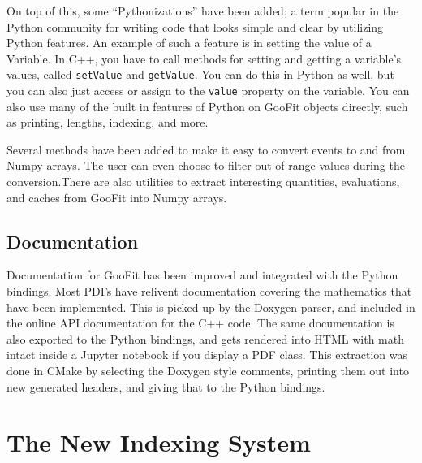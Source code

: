 \documentclass{webofc}
\begin{document}
On top of this, some ``Pythonizations'' have been added; a term popular in the Python community for writing code that looks simple and clear by utilizing Python features. An example of such a feature is in setting the value of a Variable. In C++, you have to call  methods for setting and getting a variable's values, called \texttt{setValue} and \texttt{getValue}. You can do this in Python as well, but you can also just access or assign to the \texttt{value} property on the variable. You can also use many of the built in features of Python on GooFit objects directly, such as printing, lengths, indexing, and more.

Several methods have been added to make it easy to convert events to and from Numpy arrays. The user can even choose to filter out-of-range values during the conversion.There are also utilities to extract interesting quantities, evaluations, and caches from GooFit into Numpy arrays. 

\subsection{Documentation}

Documentation for GooFit has been improved and integrated with the Python bindings. Most PDFs have relivent documentation covering the mathematics that have been implemented. This is picked up by the Doxygen parser, and included in the online API documentation for the C++ code. The same documentation is also exported to the Python bindings, and gets rendered into HTML with math intact inside a Jupyter notebook if you display a PDF class. This extraction was done in CMake by selecting the Doxygen style comments, printing them out into new generated headers, and giving that to the Python bindings.

\section{The New Indexing System}
\label{sec-ind}
\end{document}
